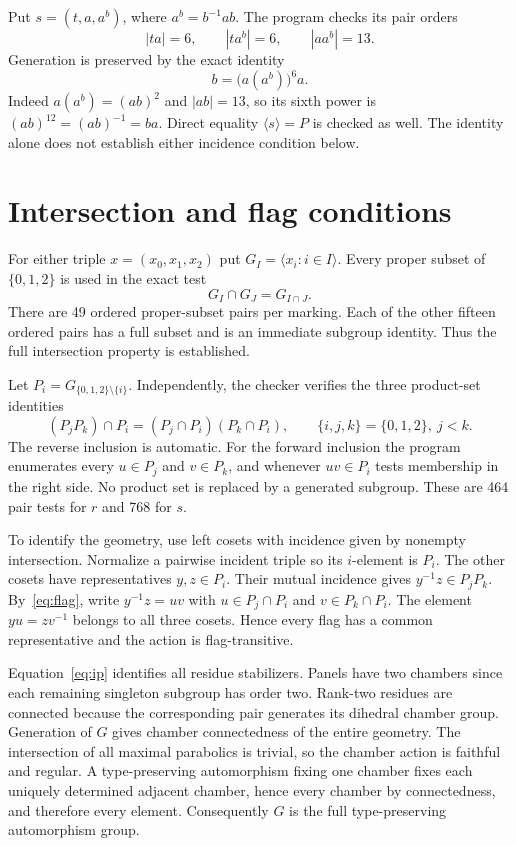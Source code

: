 \documentclass[11pt]{article}
\begin{document}
Put $s=(t,a,a^b)$, where $a^b=b^{-1}ab$. The program checks its pair orders
\begin{equation}\label{eq:triangle}
 |ta|=6,\qquad |t a^b|=6,\qquad |a a^b|=13.
\end{equation}
Generation is preserved by the exact identity
\[
 b=\bigl(a(a^b)\bigr)^6a.
\]
Indeed $a(a^b)=(ab)^2$ and $|ab|=13$, so its sixth power is $(ab)^{12}=(ab)^{-1}=ba$. Direct equality $\langle s\rangle=P$ is checked as well. The identity alone does not establish either incidence condition below.
\section{Intersection and flag conditions}
For either triple $x=(x_0,x_1,x_2)$ put $G_I=\langle x_i:i\in I\rangle$. Every proper subset of $\{0,1,2\}$ is used in the exact test
\begin{equation}\label{eq:ip}
 G_I\cap G_J=G_{I\cap J}.
\end{equation}
There are 49 ordered proper-subset pairs per marking. Each of the other fifteen ordered pairs has a full subset and is an immediate subgroup identity. Thus the full intersection property is established.

Let $P_i=G_{\{0,1,2\}\setminus\{i\}}$. Independently, the checker verifies the three product-set identities
\begin{equation}\label{eq:flag}
 (P_jP_k)\cap P_i=(P_j\cap P_i)(P_k\cap P_i),
 \qquad \{i,j,k\}=\{0,1,2\},\ j<k.
\end{equation}
The reverse inclusion is automatic. For the forward inclusion the program enumerates every $u\in P_j$ and $v\in P_k$, and whenever $uv\in P_i$ tests membership in the right side. No product set is replaced by a generated subgroup. These are 464 pair tests for $r$ and 768 for $s$.

To identify the geometry, use left cosets with incidence given by nonempty intersection. Normalize a pairwise incident triple so its $i$-element is $P_i$. The other cosets have representatives $y,z\in P_i$. Their mutual incidence gives $y^{-1}z\in P_jP_k$. By~\eqref{eq:flag}, write $y^{-1}z=uv$ with $u\in P_j\cap P_i$ and $v\in P_k\cap P_i$. The element $yu=zv^{-1}$ belongs to all three cosets. Hence every flag has a common representative and the action is flag-transitive.

Equation~\eqref{eq:ip} identifies all residue stabilizers. Panels have two chambers since each remaining singleton subgroup has order two. Rank-two residues are connected because the corresponding pair generates its dihedral chamber group. Generation of $G$ gives chamber connectedness of the entire geometry. The intersection of all maximal parabolics is trivial, so the chamber action is faithful and regular. A type-preserving automorphism fixing one chamber fixes each uniquely determined adjacent chamber, hence every chamber by connectedness, and therefore every element. Consequently $G$ is the full type-preserving automorphism group.
\end{document}
